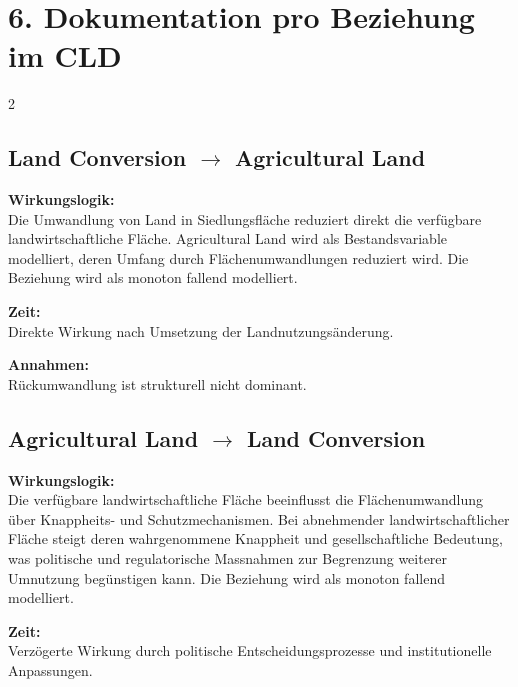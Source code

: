\documentclass[10pt, a4paper]{article}
\begin{document}
\vspace{0.5cm}

\section*{6. Dokumentation pro Beziehung im CLD}
\vspace{0.2cm}

\footnotesize %
\begin{multicols}{2}

\begin{minipage}{\linewidth}
\subsection*{Land Conversion $\rightarrow$ Agricultural Land}

\textbf{Wirkungslogik:}\\
Die Umwandlung von Land in Siedlungsfläche reduziert direkt die verfügbare landwirtschaftliche Fläche.
Agricultural Land wird als Bestandsvariable modelliert, deren Umfang durch Flächenumwandlungen reduziert wird.
Die Beziehung wird als monoton fallend modelliert.

\textbf{Zeit:}\\
Direkte Wirkung nach Umsetzung der Landnutzungsänderung.

\textbf{Annahmen:}\\
Rückumwandlung ist strukturell nicht dominant.
\end{minipage}\vspace{1em}

\begin{minipage}{\linewidth}
\subsection*{Agricultural Land $\rightarrow$ Land Conversion}

\textbf{Wirkungslogik:}\\
Die verfügbare landwirtschaftliche Fläche beeinflusst die Flächenumwandlung über Knappheits- und Schutzmechanismen.
Bei abnehmender landwirtschaftlicher Fläche steigt deren wahrgenommene Knappheit und gesellschaftliche Bedeutung, was politische und regulatorische Massnahmen zur Begrenzung weiterer Umnutzung begünstigen kann.
Die Beziehung wird als monoton fallend modelliert.

\textbf{Zeit:}\\
Verzögerte Wirkung durch politische Entscheidungsprozesse und institutionelle Anpassungen.


\end{minipage}
\end{multicols}
\end{document}
